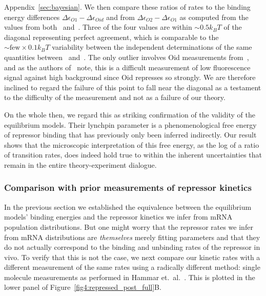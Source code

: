 Appendix~\ref{sec:bayesian}.
We then compare these ratios of rates to the binding energy differences
$\Delta\epsilon_{O1} - \Delta\epsilon_{Oid}$ and from
$\Delta\epsilon_{O2} - \Delta\epsilon_{O1}$ as computed from the values
from both~\cite{Garcia2011a} and~\cite{Razo-Mejia2018}.
Three of the four values are within $\sim0.5 k_BT$ of the diagonal
representing perfect agreement, which is comparable to the
$\sim\text{few}\times0.1 k_BT$ variability between the independent
determinations of the same quantities between~\cite{Garcia2011a}
and~\cite{Razo-Mejia2018}. The only outlier involves Oid measurements
from~\cite{Razo-Mejia2018}, and as the authors of~\cite{Razo-Mejia2018} note,
this is a difficult measurement of low fluorescence signal against
high background since Oid represses so strongly. We are therefore
inclined to regard the failure of this point to fall near the
diagonal as a testament to the difficulty of the measurement and
not as a failure of our theory.

On the whole then, we regard this as striking confirmation of the
validity of the equilibrium models. Their lynchpin parameter is a
phenomenological free energy of repressor binding that has
previously only been inferred indirectly. Our result shows that
the microscopic interpretation of this free energy, as the log of
a ratio of transition rates, does indeed hold true to within the inherent
uncertainties that remain in the entire theory-experiment dialogue.

\subsubsection{Comparison with prior measurements of repressor kinetics}
In the previous section we established the equivalence between
the equilibrium models' binding energies and the repressor
kinetics we infer from mRNA population distributions.
But one might worry that the repressor rates we infer
from mRNA distributions are \textit{themselves} merely
fitting parameters and that they do not actually correspond to the
binding and unbinding rates of the repressor in vivo.
To verify that this is not the case, we next compare our kinetic rates with a
different measurement of the same rates using a radically different method:
single molecule measurements as performed in Hammar et.\ al.~\cite{Hammar2014}.
This is plotted in the lower panel of Figure~\ref{fig4:repressed_post_full}B.

